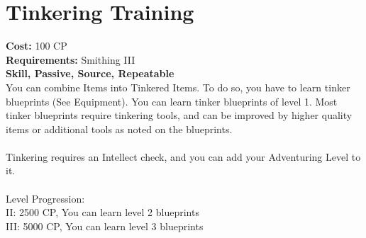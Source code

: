 \section{Tinkering Training}
\textbf{Cost:} 100 CP\\
\textbf{Requirements:} Smithing III\\
\textbf{Skill, Passive, Source, Repeatable}\\
You can combine Items into Tinkered Items. To do so, you have to learn tinker blueprints (See Equipment). You can learn tinker blueprints of level 1. Most tinker blueprints require tinkering tools, and can be improved by higher quality items or additional tools as noted on the blueprints.\\
\\
Tinkering requires an Intellect check, and you can add your Adventuring Level to it.\\
\\
Level Progression:\\
II: 2500 CP, You can learn level 2 blueprints\\
III: 5000 CP, You can learn level 3 blueprints\\